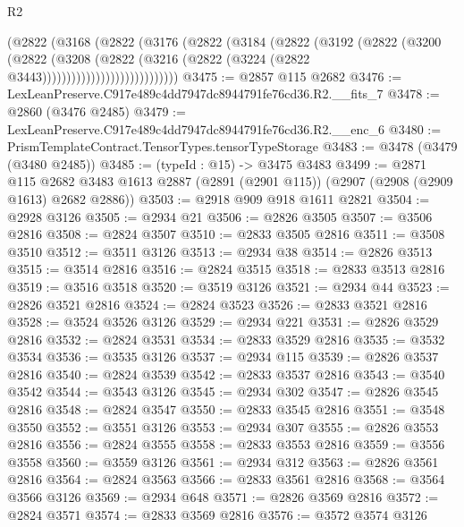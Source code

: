 \begin{lexlean}{R2}
\begin{coremodule}
                          (@2822
                            (@3168
                              (@2822
                                (@3176
                                  (@2822
                                    (@3184
                                      (@2822
                                        (@3192
                                          (@2822
                                            (@3200
                                              (@2822
                                                (@3208
                                                  (@2822
                                                    (@3216
                                                      (@2822
                                                        (@3224
                                                          (@2822 @3443))))))))))))))))))))))))))))
@3475 := @2857 @115 @2682
@3476 := LexLeanPreserve.C917e489c4dd7947dc8944791fe76cd36.R2.__fits_7
@3478 := @2860 (@3476 @2485)
@3479 := LexLeanPreserve.C917e489c4dd7947dc8944791fe76cd36.R2.__enc_6
@3480 := PrismTemplateContract.TensorTypes.tensorTypeStorage
@3483 := @3478 (@3479 (@3480 @2485))
@3485 := (typeId : @15) -> @3475 @3483
@3499 := @2871
    @115
    @2682
    @3483
    @1613
    @2887
    (@2891 (@2901 @115))
    (@2907 (@2908 (@2909 @1613) @2682 @2886))
@3503 := @2918 @909 @918 @1611 @2821
@3504 := @2928 @3126
@3505 := @2934 @21
@3506 := @2826 @3505
@3507 := @3506 @2816
@3508 := @2824 @3507
@3510 := @2833 @3505 @2816
@3511 := @3508 @3510
@3512 := @3511 @3126
@3513 := @2934 @38
@3514 := @2826 @3513
@3515 := @3514 @2816
@3516 := @2824 @3515
@3518 := @2833 @3513 @2816
@3519 := @3516 @3518
@3520 := @3519 @3126
@3521 := @2934 @44
@3523 := @2826 @3521 @2816
@3524 := @2824 @3523
@3526 := @2833 @3521 @2816
@3528 := @3524 @3526 @3126
@3529 := @2934 @221
@3531 := @2826 @3529 @2816
@3532 := @2824 @3531
@3534 := @2833 @3529 @2816
@3535 := @3532 @3534
@3536 := @3535 @3126
@3537 := @2934 @115
@3539 := @2826 @3537 @2816
@3540 := @2824 @3539
@3542 := @2833 @3537 @2816
@3543 := @3540 @3542
@3544 := @3543 @3126
@3545 := @2934 @302
@3547 := @2826 @3545 @2816
@3548 := @2824 @3547
@3550 := @2833 @3545 @2816
@3551 := @3548 @3550
@3552 := @3551 @3126
@3553 := @2934 @307
@3555 := @2826 @3553 @2816
@3556 := @2824 @3555
@3558 := @2833 @3553 @2816
@3559 := @3556 @3558
@3560 := @3559 @3126
@3561 := @2934 @312
@3563 := @2826 @3561 @2816
@3564 := @2824 @3563
@3566 := @2833 @3561 @2816
@3568 := @3564 @3566 @3126
@3569 := @2934 @648
@3571 := @2826 @3569 @2816
@3572 := @2824 @3571
@3574 := @2833 @3569 @2816
@3576 := @3572 @3574 @3126

\end{coremodule}
\end{lexlean}
